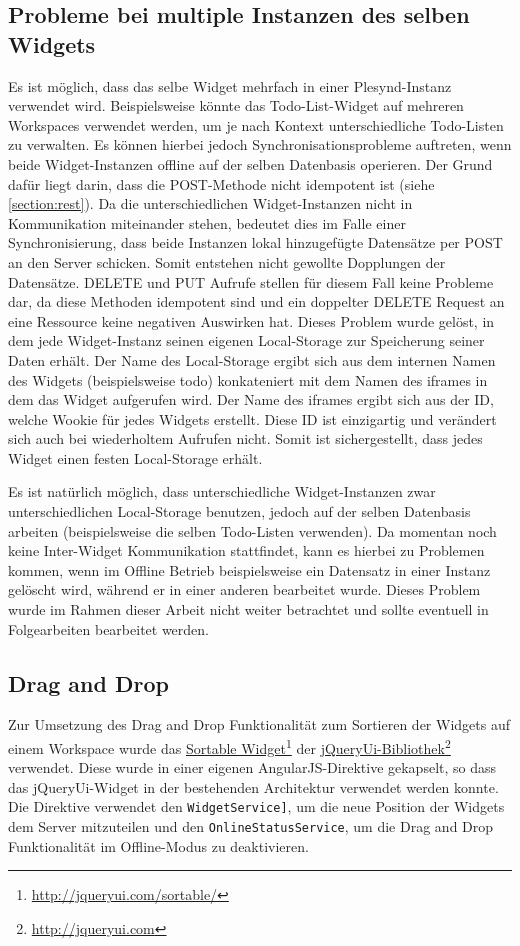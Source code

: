 \subsection{Probleme bei multiple Instanzen des selben Widgets}
Es ist möglich, dass das selbe Widget mehrfach in einer Plesynd-Instanz verwendet wird. Beispielsweise könnte das Todo-List-Widget auf mehreren Workspaces verwendet werden, um je nach Kontext unterschiedliche Todo-Listen zu verwalten. Es können hierbei jedoch Synchronisationsprobleme auftreten, wenn beide Widget-Instanzen offline auf der selben Datenbasis operieren. Der Grund dafür liegt darin, dass die POST-Methode nicht idempotent ist (siehe \ref{section:rest}). Da die unterschiedlichen Widget-Instanzen nicht in Kommunikation miteinander stehen, bedeutet dies im Falle einer Synchronisierung, dass beide Instanzen lokal hinzugefügte Datensätze per POST an den Server schicken. Somit entstehen nicht gewollte Dopplungen der Datensätze. DELETE und PUT Aufrufe stellen für diesem Fall keine Probleme dar, da diese Methoden idempotent sind und ein doppelter DELETE Request an eine Ressource keine negativen Auswirken hat. Dieses Problem wurde gelöst, in dem jede Widget-Instanz seinen eigenen Local-Storage zur Speicherung seiner Daten erhält. Der Name des Local-Storage ergibt sich aus dem internen Namen des Widgets (beispielsweise todo) konkateniert mit dem Namen des iframes in dem das Widget aufgerufen wird. Der Name des iframes ergibt sich aus der ID, welche Wookie für jedes Widgets erstellt. Diese ID ist einzigartig und verändert sich auch bei wiederholtem Aufrufen nicht. Somit ist sichergestellt, dass jedes Widget einen festen Local-Storage erhält.

Es ist natürlich möglich, dass unterschiedliche Widget-Instanzen zwar unterschiedlichen Local-Storage benutzen, jedoch auf der selben Datenbasis arbeiten (beispielsweise die selben Todo-Listen verwenden). Da momentan noch keine Inter-Widget Kommunikation stattfindet, kann es hierbei zu Problemen kommen, wenn im Offline Betrieb beispielsweise ein Datensatz in einer Instanz gelöscht wird, während er in einer anderen bearbeitet wurde. Dieses Problem wurde im Rahmen dieser Arbeit nicht weiter betrachtet und sollte eventuell in Folgearbeiten bearbeitet werden.

\subsection{Drag and Drop}
Zur Umsetzung des Drag and Drop Funktionalität zum Sortieren der Widgets auf einem Workspace wurde das \href{http://jqueryui.com/sortable/}{Sortable Widget}\footnote{\url{http://jqueryui.com/sortable/}} der \href{http://jqueryui.com}{jQueryUi-Bibliothek}\footnote{\url{http://jqueryui.com}} verwendet. Diese wurde in einer eigenen AngularJS-Direktive gekapselt, so dass das jQueryUi-Widget in der bestehenden Architektur verwendet werden konnte. Die Direktive verwendet den \texttt{WidgetService]}, um die neue Position der Widgets dem Server mitzuteilen und den \texttt{OnlineStatusService}, um die Drag and Drop Funktionalität im Offline-Modus zu deaktivieren.

